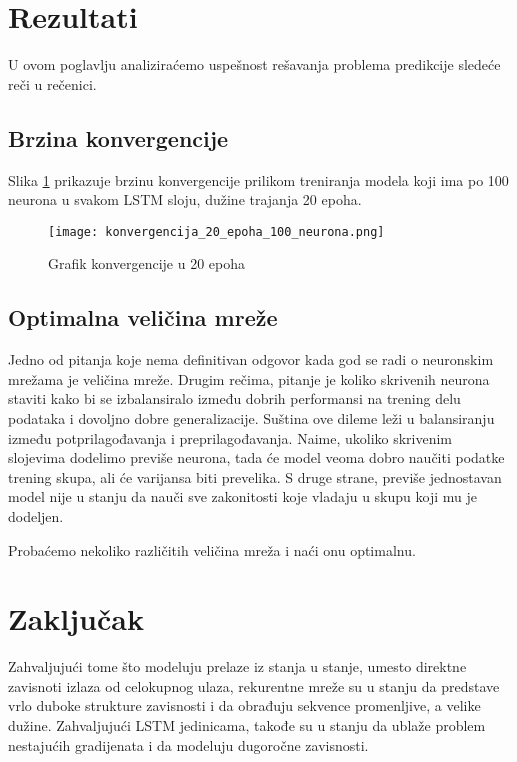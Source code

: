 \documentclass[a4paper]{article}
\begin{document}
\section{Rezultati}

U ovom poglavlju analiziraćemo uspešnost rešavanja problema predikcije sledeće reči u rečenici. 

\subsection{Brzina konvergencije}

Slika \ref{fig:konv_20} prikazuje brzinu konvergencije prilikom treniranja modela koji ima po 100 neurona u svakom LSTM sloju, dužine trajanja 20 epoha.

\begin{figure}[htp]
    \centering
    \texttt{[image: konvergencija\_20\_epoha\_100\_neurona.png]}
    \caption{Grafik konvergencije u 20 epoha}
    \label{fig:konv_20}
\end{figure}



\subsection{Optimalna veličina mreže}

Jedno od pitanja koje nema definitivan odgovor kada god se radi o neuronskim mrežama je veličina mreže. Drugim rečima, pitanje je koliko skrivenih neurona staviti kako bi se izbalansiralo između dobrih performansi na trening delu podataka i dovoljno dobre generalizacije. Suština ove dileme leži u balansiranju između potprilagođavanja i preprilagođavanja. Naime, ukoliko skrivenim slojevima dodelimo previše neurona, tada će model veoma dobro naučiti podatke trening skupa, ali će varijansa biti prevelika. S druge strane, previše jednostavan model nije u stanju da nauči sve zakonitosti koje vladaju u skupu koji mu je dodeljen.

Probaćemo nekoliko različitih veličina mreža i naći onu optimalnu. 


\section{Zaključak}

Zahvaljujući tome što modeluju prelaze iz stanja u stanje, umesto direktne zavisnoti izlaza od celokupnog ulaza, rekurentne mreže su u stanju da predstave vrlo duboke strukture zavisnosti i da obrađuju sekvence promenljive, a velike dužine. Zahvaljujući LSTM jedinicama, takođe su u stanju da ublaže problem nestajućih gradijenata i da modeluju dugoročne zavisnosti. 
\end{document}
